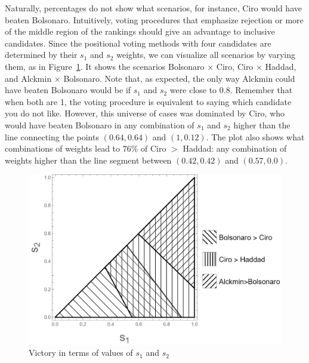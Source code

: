 \documentclass[hidelinks,11pt]{article}
\begin{document}
Naturally, percentages do not show what scenarios, for instance, Ciro would have beaten Bolsonaro. Intuitively, voting procedures that emphasize rejection or more of the middle region of the rankings should give an advantage to inclusive candidates. Since the positional voting methods with four candidates are determined by their \(s_{1}\) and \(s_{2}\) weights, we can visualize all scenarios by varying them,   as in Figure~\ref{fig:positional4c}. It shows the scenarios Bolsonaro \(\times\) Ciro, Ciro \(\times \) Haddad, and Alckmin \(\times\) Bolsonaro. Note that, as expected, the only way Alckmin could have beaten Bolsonaro would be if \(s_{1}\) and \(s_{2}\) were close to 0.8. Remember that when both are 1, the voting procedure is equivalent to saying which candidate you do not like. However, this universe of cases was dominated by Ciro, who would have beaten Bolsonaro in any combination of \(s_{1}\) and \(s_{2}\) higher than the line connecting the points \((0.64,0.64)\) and \((1,0.12)\). The plot also shows what combinations of weights lead to \(76\%\) of Ciro \(>\) Haddad: any combination of weights higher than the line segment between \((0.42,0.42)\) and \((0.57,0.0)\).


\begin{figure}[H]
 \centering
 \includegraphics[width=\columnwidth,
 height=0.3\textheight]{./images/counterfactual_triangle.png}
\caption{Victory in terms of values of \(s_{1}\) and \(s_{2}\)}
 \label{fig:positional4c}
\end{figure}
\end{document}
